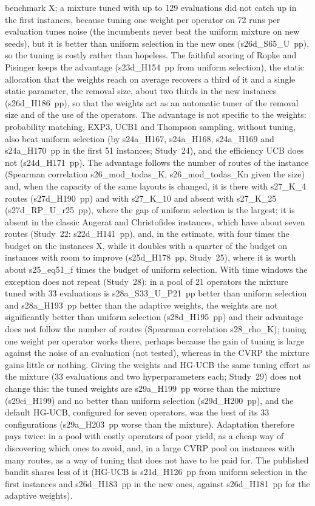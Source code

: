 benchmark X; a mixture tuned with up to 129 evaluations did not catch up in the first instances, because tuning one weight per operator on 72 runs per evaluation tunes noise (the incumbents never beat the uniform mixture on new seeds), but it is better than uniform selection in the new ones (\num{s26d_S65_U}~pp), so the tuning is costly rather than hopeless. The faithful scoring of Ropke and Pisinger keeps the advantage (\num{s23d_H154}~pp from uniform selection), the static allocation that the weights reach on average recovers a third of it and a single static parameter, the removal size, about two thirds in the new instances (\num{s26d_H186}~pp), so that the weights act as an automatic tuner of the removal size and of the use of the operators. The advantage is not specific to the weights: probability matching, EXP3, UCB1 and Thompson sampling, without tuning, also beat uniform selection (by \num{s24a_H167}, \num{s24a_H168}, \num{s24a_H169} and \num{s24a_H170}~pp in the first 51 instances; Study~24), and the efficiency UCB does not (\num{s24d_H171}~pp). The advantage follows the number of routes of the instance (Spearman correlation \num{s26_mod_todas_K}, \num{s26_mod_todas_Kn} given the size) and, when the capacity of the same layouts is changed, it is there with \num{s27_K_4} routes (\num{s27d_H190}~pp) and with \num{s27_K_10} and absent with \num{s27_K_25} (\num{s27d_RP_U_r25}~pp), where the gap of uniform selection is the largest; it is absent in the classic Augerat and Christofides instances, which have about seven routes (Study~22: \num{s22d_H141}~pp), and, in the estimate, with four times the budget on the instances X, while it doubles with a quarter of the budget on instances with room to improve (\num{s25d_H178}~pp, Study~25), where it is worth about \num{s25_eq51_f} times the budget of uniform selection. With time windows the exception does not repeat (Study~28): in a pool of 21 operators the mixture tuned with 33 evaluations is \num{s28a_S33_U_P21}~pp better than uniform selection and \num{s28a_H193}~pp better than the adaptive weights, the weights are not significantly better than uniform selection (\num{s28d_H195}~pp) and their advantage does not follow the number of routes (Spearman correlation \num{s28_rho_K}); tuning one weight per operator works there, perhaps because the gain of tuning is large against the noise of an evaluation (not tested), whereas in the CVRP the mixture gains little or nothing. Giving the weights and HG-UCB the same tuning effort as the mixture (33 evaluations and two hyperparameters each; Study~29) does not change this: the tuned weights are \num{s29a_H199}~pp worse than the mixture (\num{s29ci_H199}) and no better than uniform selection (\num{s29d_H200}~pp), and the default HG-UCB, configured for seven operators, was the best of its 33 configurations (\num{s29a_H203}~pp worse than the mixture). Adaptation therefore pays twice: in a pool with costly operators of poor yield, as a cheap way of discovering which ones to avoid, and, in a large CVRP pool on instances with many routes, as a way of tuning that does not have to be paid for. The published bandit shares less of it (HG-UCB is \num{s21d_H126}~pp from uniform selection in the first instances and \num{s26d_H183}~pp in the new ones, against \num{s26d_H181}~pp for the adaptive weights).

